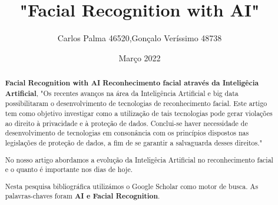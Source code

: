 \documentclass{article}
\title{"Facial Recognition with AI"}
\author{Carlos Palma 46520,Gonçalo Veríssimo 48738}
\date{Março 2022}
\begin{document}
\maketitle
\begin{abstract}

\textbf{Facial Recognition with AI} \textbf{Reconhecimento facial através da Inteligêcia Artificial}, "Os recentes avanços na área da Inteligência Artificial e big data possibilitaram o desenvolvimento de tecnologias de reconhecimento facial. Este artigo tem como objetivo investigar como a utilização de tais tecnologias pode gerar violações ao direito à privacidade e à proteção de dados. Conclui-se haver necessidade de desenvolvimento de tecnologias em consonância com os princípios dispostos nas legislações de proteção de dados, a fim de se garantir a salvaguarda desses direitos."

No nosso artigo abordamos a evolução da Inteligêcia Artificial no reconhecimento facial e o quanto é importante nos dias de hoje.

Nesta pesquisa bibliográfica utilizámos o Google Scholar como motor de busca. As palavras-chaves foram \textbf{AI e Facial Recognition}.

\end{abstract}

\cite{a}
\cite{b}
\cite{c}
\cite{d}
\cite{e}
\cite{f}
\cite{g}



\end{document}
